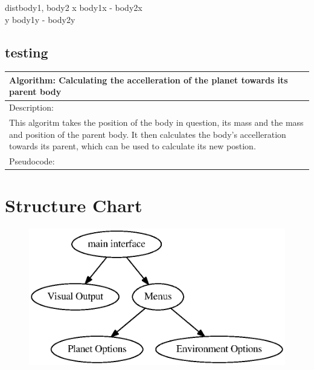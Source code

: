 \begin{pseudocode}{dist}{body1, body2}
	x \GETS \lvert body1x - body2x \lvert \\
	y \GETS \lvert body1y - body2y \lvert \\
\end{pseudocode}

\subsection{testing}

\begin{tabular}{|p{\textwidth}}
	\hline
	Algorithm: Calculating the accelleration of the planet towards its parent body \\
	\hline 
	Description: \\
	This algoritm takes the position of the body in question, its mass 
	and the mass and position of the parent body. It then calculates the body's
	accelleration towards its parent, which can be used to calculate its new postion. \\
	\hline
	Pseudocode: \\
	

\end{tabular}

\section{Structure Chart}
\begin{figure}[h]
	\includegraphics[width=\textwidth]{./img/hier.eps}
\end{figure}
